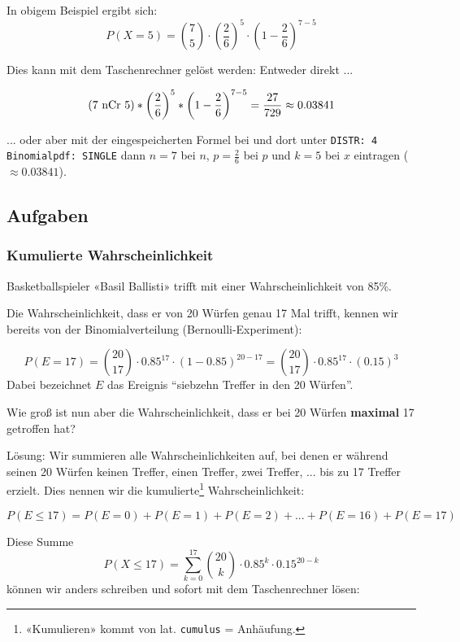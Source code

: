 In obigem Beispiel ergibt sich:
$$P(X=5) =
{{7}\choose {5}}
\cdot{}\left(\frac26\right)^5\cdot{}\left(1-\frac26\right)^{7-5}$$

Dies kann mit dem Taschenrechner gelöst werden:
Entweder direkt ...

$$( 7 \textrm{\,\,nCr\,\,} 5 ) *\left(\frac26\right)^5 *
\left(1-\frac26\right)^{7-5} = \frac{27}{729} \approx 0.03841$$

... oder aber mit der eingespeicherten Formel bei
 und dort unter \texttt{DISTR: 4
  Binomialpdf: SINGLE} dann $n=7$ bei $n$, $p=\frac26$ bei $p$ und
$k=5$ bei $x$ eintragen ($\approx 0.03841$).
\newpage

\subsection*{Aufgaben}



\newpage
\subsubsection{Kumulierte Wahrscheinlichkeit}

Basketballspieler «Basil Ballisti» trifft mit einer
Wahrscheinlichkeit von 85\%.

Die Wahrscheinlichkeit, dass er von 20 Würfen genau 17 Mal trifft, kennen wir
bereits von der Binomialverteilung (Bernoulli-Experiment):

$$P(E=17) = {20 \choose 17}\cdot 0.85^{17}\cdot (1-0.85)^{20-17} =  {20 \choose 17}\cdot 0.85^{17}\cdot (0.15)^{3}$$
Dabei bezeichnet $E$ das Ereignis ``siebzehn Treffer in den 20 Würfen''.

Wie groß ist nun aber die Wahrscheinlichkeit, dass er bei 20 Würfen
\textbf{maximal} 17 getroffen hat?

Lösung: Wir summieren alle Wahrscheinlichkeiten auf, bei denen er
während seinen 20 Würfen
keinen Treffer, einen Treffer, zwei Treffer, ... bis zu 17 Treffer
erzielt. Dies nennen wir die kumulierte\footnote{«Kumulieren» kommt von
  lat. \texttt{cumulus} = Anhäufung.} Wahrscheinlichkeit:

$$P(E\le 17) = P(E=0) + P(E=1) + P(E=2) + ... + P(E=16) + P(E=17)$$

Diese Summe
$$P(X\le 17) = \sum_{k=0}^{17} {20 \choose k} \cdot 0.85^k \cdot 0.15^{20-k}$$
können wir anders schreiben und sofort mit dem
Taschenrechner lösen:

